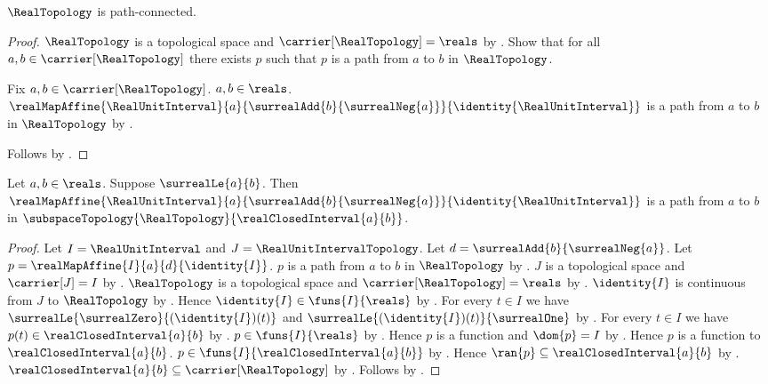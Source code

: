 \begin{theorem}\label{real_topology_is_path_connected}
    $\RealTopology$ is path-connected.
\end{theorem}
\begin{proof}
    $\RealTopology$ is a topological space and $\carrier[\RealTopology]=\reals$ by
        .
    Show that for all $a,b\in\carrier[\RealTopology]$ there exists $p$ such that
        $p$ is a path from $a$ to $b$ in $\RealTopology$.
    \begin{subproof}
        Fix $a,b\in\carrier[\RealTopology]$.
        $a,b\in\reals$.
        $\realMapAffine{\RealUnitInterval}{a}{\surrealAdd{b}{\surrealNeg{a}}}
            {\identity{\RealUnitInterval}}$ is a path from $a$ to $b$ in $\RealTopology$ by
            .
    \end{subproof}
    Follows by .
\end{proof}

\begin{theorem}\label{real_affine_path_in_closed_interval}
    Let $a,b\in\reals$.
    Suppose $\surrealLe{a}{b}$.
    Then $\realMapAffine{\RealUnitInterval}{a}{\surrealAdd{b}{\surrealNeg{a}}}
        {\identity{\RealUnitInterval}}$ is a path from $a$ to $b$ in
        $\subspaceTopology{\RealTopology}{\realClosedInterval{a}{b}}$.
\end{theorem}
\begin{proof}
    Let $I=\RealUnitInterval$ and $J=\RealUnitIntervalTopology$.
    Let $d=\surrealAdd{b}{\surrealNeg{a}}$.
    Let $p=\realMapAffine{I}{a}{d}{\identity{I}}$.
    $p$ is a path from $a$ to $b$ in $\RealTopology$ by .
    $J$ is a topological space and $\carrier[J]=I$ by
        .
    $\RealTopology$ is a topological space and $\carrier[\RealTopology]=\reals$ by
        .
    $\identity{I}$ is continuous from $J$ to $\RealTopology$ by
        .
    Hence $\identity{I}\in\funs{I}{\reals}$ by .
    For every $t\in I$ we have $\surrealLe{\surrealZero}{(\identity{I})(t)}$ and
        $\surrealLe{(\identity{I})(t)}{\surrealOne}$ by .
    For every $t\in I$ we have $p(t)\in\realClosedInterval{a}{b}$ by
        .
    $p\in\funs{I}{\reals}$ by .
    Hence $p$ is a function and $\dom{p}=I$ by .
    Hence $p$ is a function to $\realClosedInterval{a}{b}$.
    $p\in\funs{I}{\realClosedInterval{a}{b}}$ by .
    Hence $\ran{p}\subseteq\realClosedInterval{a}{b}$ by .
    $\realClosedInterval{a}{b}\subseteq\carrier[\RealTopology]$ by
        .
    Follows by .
\end{proof}
